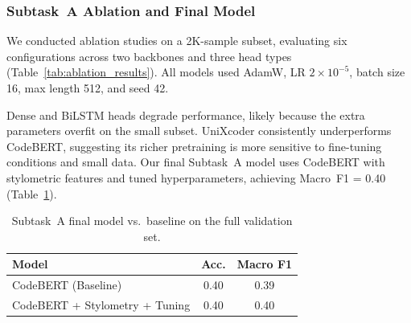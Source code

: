 \documentclass[11pt]{article}
\begin{document}
\subsubsection{Subtask~A Ablation and Final Model}

We conducted ablation studies on a 2K-sample subset, evaluating six configurations across two backbones and three head types (Table~\ref{tab:ablation_results}). All models used AdamW, LR $2{\times}10^{-5}$, batch size 16, max length 512, and seed 42.

\begin{table}[ht]
\centering
\label{tab:ablation_results}
\caption{Subtask~A ablation results on the small evaluation set. ``Sty.'' = stylometric features, ``Smooth.'' = label smoothing.}
\end{table}

Dense and BiLSTM heads degrade performance, likely because the extra parameters overfit on the small subset. UniXcoder consistently underperforms CodeBERT, suggesting its richer pretraining is more sensitive to fine-tuning conditions and small data. Our final Subtask~A model uses CodeBERT with stylometric features and tuned hyperparameters, achieving Macro~F1 = 0.40 (Table~\ref{tab:taskA_final}).

\begin{table}[ht]
\centering
\small
\begin{tabularx}{\columnwidth}{@{}X c c@{}}
\toprule
\textbf{Model} & \textbf{Acc.} & \textbf{Macro F1} \\
\midrule
CodeBERT (Baseline) & 0.40 & 0.39 \\
CodeBERT + Stylometry + Tuning & 0.40 & 0.40 \\
\bottomrule
\end{tabularx}
\caption{Subtask~A final model vs.\ baseline on the full validation set.}
\label{tab:taskA_final}
\end{table}
\end{document}
